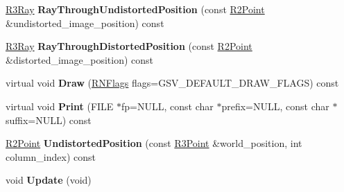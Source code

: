 \begin{DoxyCompactItemize}
\item 
\hyperlink{class_r3_ray}{R3\+Ray} {\bfseries Ray\+Through\+Undistorted\+Position} (const \hyperlink{class_r2_point}{R2\+Point} \&undistorted\+\_\+image\+\_\+position) const \hypertarget{class_g_s_v_image_abfe10941e6c1e760d5b3167fcfe3ebb2}{}\label{class_g_s_v_image_abfe10941e6c1e760d5b3167fcfe3ebb2}

\item 
\hyperlink{class_r3_ray}{R3\+Ray} {\bfseries Ray\+Through\+Distorted\+Position} (const \hyperlink{class_r2_point}{R2\+Point} \&distorted\+\_\+image\+\_\+position) const \hypertarget{class_g_s_v_image_a7e3eef3c7670dcf8824f829744535951}{}\label{class_g_s_v_image_a7e3eef3c7670dcf8824f829744535951}

\item 
virtual void {\bfseries Draw} (\hyperlink{class_r_n_flags}{R\+N\+Flags} flags=G\+S\+V\+\_\+\+D\+E\+F\+A\+U\+L\+T\+\_\+\+D\+R\+A\+W\+\_\+\+F\+L\+A\+GS) const \hypertarget{class_g_s_v_image_ae55e5cbcb614a42c656e9f0eee5b7a8e}{}\label{class_g_s_v_image_ae55e5cbcb614a42c656e9f0eee5b7a8e}

\item 
virtual void {\bfseries Print} (F\+I\+LE $\ast$fp=N\+U\+LL, const char $\ast$prefix=N\+U\+LL, const char $\ast$suffix=N\+U\+LL) const \hypertarget{class_g_s_v_image_aee46feb45a09bab9fb6ec5b9ec2e2467}{}\label{class_g_s_v_image_aee46feb45a09bab9fb6ec5b9ec2e2467}

\item 
\hyperlink{class_r2_point}{R2\+Point} {\bfseries Undistorted\+Position} (const \hyperlink{class_r3_point}{R3\+Point} \&world\+\_\+position, int column\+\_\+index) const \hypertarget{class_g_s_v_image_a9df44c885012b86debcbdf6f7a66b313}{}\label{class_g_s_v_image_a9df44c885012b86debcbdf6f7a66b313}

\item 
void {\bfseries Update} (void)\hypertarget{class_g_s_v_image_a22611b272c834698ea8bc0e7c51eaccc}{}\label{class_g_s_v_image_a22611b272c834698ea8bc0e7c51eaccc}

\end{DoxyCompactItemize}
